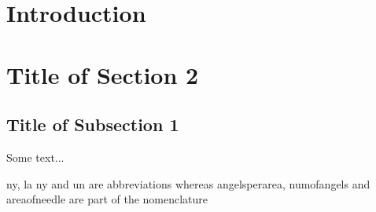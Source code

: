 \newpage
\section{Introduction}


\newpage
\section{Title of Section 2} 


\subsection{Title of Subsection 1}

Some text...~\cite[1-2]{traeinfo}

\ac{ny}, \ac{la} \ac{ny} and \ac{un} are abbreviations whereas
\ac{angelsperarea}, \ac{numofangels} and \ac{areaofneedle} are part of the
nomenclature

